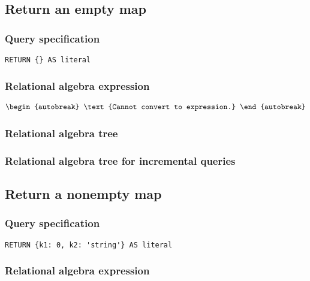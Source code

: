 \subsection{Return an empty map}

\subsubsection*{Query specification}

\begin{lstlisting}
RETURN {} AS literal
\end{lstlisting}

\subsubsection*{Relational algebra expression}

\begin{align*}
\begin{autobreak}
\text{Cannot convert to expression.}
\end{autobreak}
\end{align*}

\subsubsection*{Relational algebra tree}


\subsubsection*{Relational algebra tree for incremental queries}


\subsection{Return a nonempty map}

\subsubsection*{Query specification}

\begin{lstlisting}
RETURN {k1: 0, k2: 'string'} AS literal
\end{lstlisting}

\subsubsection*{Relational algebra expression}

